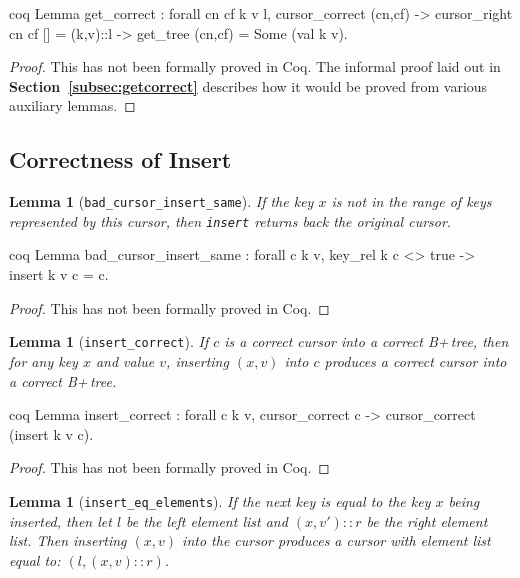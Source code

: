 \documentclass[12pt]{article}
\newtheorem{lemma}[theorem]{Lemma}
\newcommand{\nocontentsline}[3]{}
\newcommand{\tocless}[2]{\bgroup\let\addcontentsline=\nocontentsline#1{#2}\egroup}
\begin{document}
\begin{appendices}
\begin{singlespace}
\begin{cminted}{coq}
Lemma get_correct : forall cn cf k v l,
  cursor_correct (cn,cf) ->
  cursor_right cn cf [] = (k,v)::l ->
  get_tree (cn,cf) = Some (val k v).
\end{cminted}

\begin{proof}
This has not been formally proved in Coq. The informal proof laid out in \textbf{Section~\ref{subsec:getcorrect}} describes how it would be proved from various auxiliary lemmas.
\end{proof}

\tocless\subsection{Correctness of Insert}

\begin{lemma}[\texttt{bad\_cursor\_insert\_same}]
If the key $x$ is not in the range of keys represented by this cursor, then \texttt{insert} returns back the original cursor.
\end{lemma}

\begin{cminted}{coq}
Lemma bad_cursor_insert_same : forall c k v,
  key_rel k c <> true -> insert k v c = c.
\end{cminted}

\begin{proof}
This has not been formally proved in Coq.
\end{proof}

\begin{lemma}[\texttt{insert\_correct}]
If $c$ is a correct cursor into a correct B+\,tree, then for any key $x$ and value $v$, inserting $(x,v)$ into $c$ produces a correct cursor into a correct B+\,tree.
\end{lemma}

\begin{cminted}{coq}
Lemma insert_correct : forall c k v,
  cursor_correct c -> cursor_correct (insert k v c).
\end{cminted}

\begin{proof}
This has not been formally proved in Coq.
\end{proof}

\begin{lemma}[\texttt{insert\_eq\_elements}]
If the next key is equal to the key $x$ being inserted, then let $l$ be the left element list and $(x,v')::r$ be the right element list. Then inserting $(x,v)$ into the cursor produces a cursor with element list equal to: $(l,(x,v)::r)$.
\end{lemma}


\end{singlespace}
\end{appendices}
\end{document}
